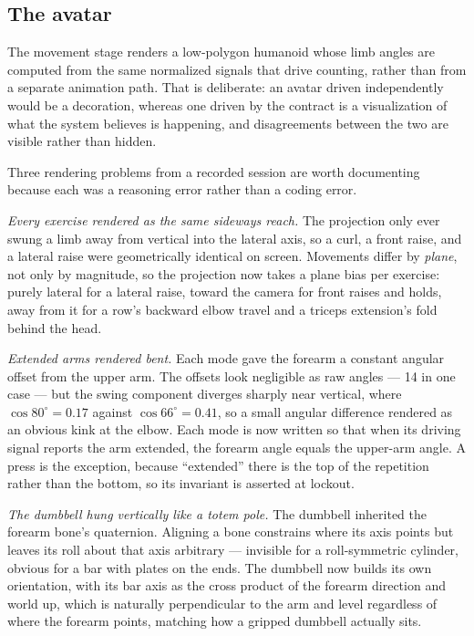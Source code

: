 \documentclass[11pt,a4paper]{article}
\begin{document}
\subsection{The avatar}

The movement stage renders a low-polygon humanoid whose limb angles are computed
from the same normalized signals that drive counting, rather than from a
separate animation path. That is deliberate: an avatar driven independently
would be a decoration, whereas one driven by the contract is a visualization of
what the system believes is happening, and disagreements between the two are
visible rather than hidden.

Three rendering problems from a recorded session are worth documenting because
each was a reasoning error rather than a coding error.

\emph{Every exercise rendered as the same sideways reach.} The projection only
ever swung a limb away from vertical into the lateral axis, so a curl, a front
raise, and a lateral raise were geometrically identical on screen. Movements
differ by \emph{plane}, not only by magnitude, so the projection now takes a
plane bias per exercise: purely lateral for a lateral raise, toward the camera
for front raises and holds, away from it for a row's backward elbow travel and a
triceps extension's fold behind the head.

\emph{Extended arms rendered bent.} Each mode gave the forearm a constant
angular offset from the upper arm. The offsets look negligible as raw angles ---
14\textdegree{} in one case --- but the swing component diverges sharply near
vertical, where $\cos 80^{\circ} = 0.17$ against $\cos 66^{\circ} = 0.41$,
so a small angular difference rendered as an obvious kink at the elbow. Each
mode is now written so that when its driving signal reports the arm extended,
the forearm angle equals the upper-arm angle. A press is the exception, because
``extended'' there is the top of the repetition rather than the bottom, so its
invariant is asserted at lockout.

\emph{The dumbbell hung vertically like a totem pole.} The dumbbell inherited
the forearm bone's quaternion. Aligning a bone constrains where its axis points
but leaves its roll about that axis arbitrary --- invisible for a
roll-symmetric cylinder, obvious for a bar with plates on the ends. The
dumbbell now builds its own orientation, with its bar axis as the cross product
of the forearm direction and world up, which is naturally perpendicular to the
arm and level regardless of where the forearm points, matching how a gripped
dumbbell actually sits.
\end{document}
